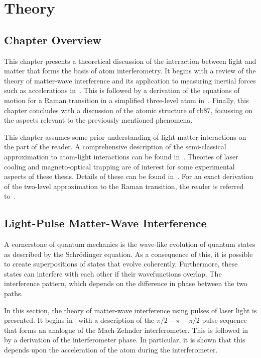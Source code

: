 \chapter{Theory}\label{chap:theory}
\section{Chapter Overview}\label{sec:theory_overview}
This chapter presents a theoretical discussion of the interaction
between light and matter that forms the basis of atom interferometry.
It begins with a review of the theory of matter-wave interference and
its application to measuring inertial forces such as accelerations
in~. This is followed by a derivation of
the equations of motion for a Raman transition in a simplified
three-level atom
in~. Finally, this chapter concludes with
a discussion of the atomic structure of \ac{rb87}, focussing on the
aspects relevant to the previously mentioned phenomena.
\par\noindent
This chapter assumes some prior understanding of light-matter
interactions on the part of the reader. A comprehensive description of
the semi-classical approximation to atom-light interactions can be
found in~\cite{Grynberg2011}. Theories of laser cooling and magneto-optical
trapping are of interest for some experimental aspects of these thesis.
Details of these can be found in~\cite{Metcalf2003}. For an exact derivation of
the two-level approximation to the Raman transition, the reader is referred
to~\cite{Wu1996}.  
\section{Light-Pulse Matter-Wave Interference}\label{sec:theory_atomint}
A cornerstone of quantum mechanics is the wave-like evolution of
quantum states as described by the Schr\"odinger equation. As a
consequence of this, it is possible to create superpositions of states
that evolve coherently. Furthermore, these states can interfere with
each other if their wavefunctions overlap. The interference pattern,
which depends on the difference in phase between the two paths.
\par\noindent
In this section, the theory of matter-wave interference using pulses
of laser light is presented. It begins in~ with a description of the
$\pi/2-\pi-\pi/2$ pulse sequence that forms an analogue of the
Mach-Zehnder interferometer. This is
followed in~ by a derivation of the interferometer phase. In
particular, it is shown that this depends upon the
acceleration of the atom during the interferometer. 

